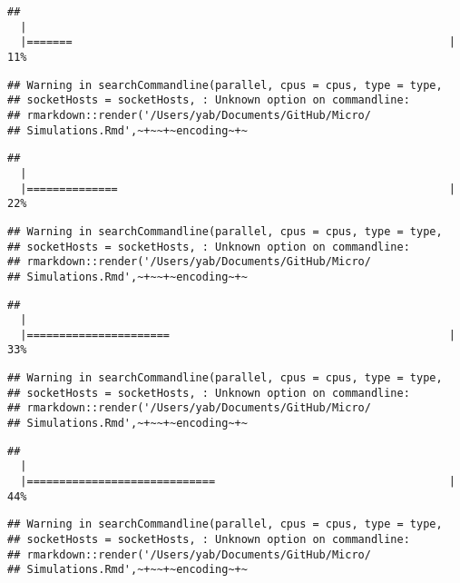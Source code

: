 \documentclass[]{article}
\begin{document}
\begin{verbatim}
## 
  |                                                                       
  |=======                                                          |  11%
\end{verbatim}

\begin{verbatim}
## Warning in searchCommandline(parallel, cpus = cpus, type = type,
## socketHosts = socketHosts, : Unknown option on commandline:
## rmarkdown::render('/Users/yab/Documents/GitHub/Micro/
## Simulations.Rmd',~+~~+~encoding~+~
\end{verbatim}

\begin{verbatim}
## 
  |                                                                       
  |==============                                                   |  22%
\end{verbatim}

\begin{verbatim}
## Warning in searchCommandline(parallel, cpus = cpus, type = type,
## socketHosts = socketHosts, : Unknown option on commandline:
## rmarkdown::render('/Users/yab/Documents/GitHub/Micro/
## Simulations.Rmd',~+~~+~encoding~+~
\end{verbatim}

\begin{verbatim}
## 
  |                                                                       
  |======================                                           |  33%
\end{verbatim}

\begin{verbatim}
## Warning in searchCommandline(parallel, cpus = cpus, type = type,
## socketHosts = socketHosts, : Unknown option on commandline:
## rmarkdown::render('/Users/yab/Documents/GitHub/Micro/
## Simulations.Rmd',~+~~+~encoding~+~
\end{verbatim}

\begin{verbatim}
## 
  |                                                                       
  |=============================                                    |  44%
\end{verbatim}

\begin{verbatim}
## Warning in searchCommandline(parallel, cpus = cpus, type = type,
## socketHosts = socketHosts, : Unknown option on commandline:
## rmarkdown::render('/Users/yab/Documents/GitHub/Micro/
## Simulations.Rmd',~+~~+~encoding~+~
\end{verbatim}
\end{document}
